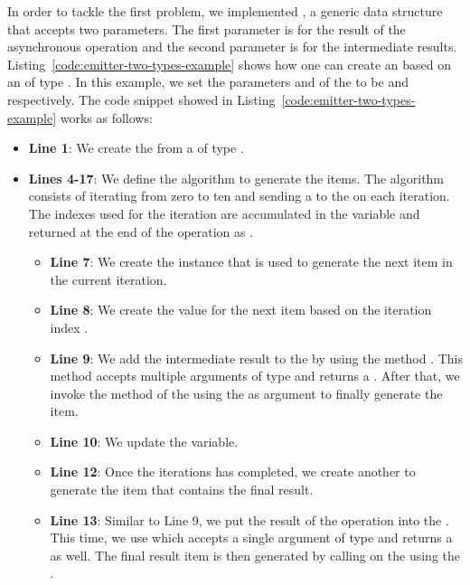 \documentclass[type=bsc,accentcolor=tud9c]{tudthesis}
\begin{document}
In order to tackle the first problem, we implemented , a generic data structure that accepts two parameters. The first parameter  is for the result of the asynchronous operation and the second parameter  is for the intermediate results. Listing~\ref{code:emitter-two-types-example} shows how one can create an  based on an  of type . In this example, we set the parameters  and  of the  to be  and  respectively. The code snippet showed in Listing~\ref{code:emitter-two-types-example} works as follows:
\begin{itemize}
	\item {\bf Line 1}: We create the  from a  of type .
	\item {\bf Lines 4-17}: We define the algorithm to generate the items. The algorithm consists of iterating from zero to ten and sending a  to the  on each iteration. The indexes  used for the iteration are accumulated in the variable  and returned at the end of the operation as .
	\begin{itemize}
		\item {\bf Line 7}: We create the  instance that is used to generate the next item in the current iteration.
		\item {\bf Line 8}: We create the  value for the next item based on the iteration index .
		\item {\bf Line 9}: We add the intermediate result  to the  by using the method . This method accepts multiple arguments of type  and returns a . After that, we invoke the  method of the  using the  as argument to finally generate the item.
		\item {\bf Line 10}: We update the  variable.
		\item {\bf Line 12}: Once the iterations has completed, we create another  to generate the item that contains the final result.
		\item {\bf Line 13}: Similar to Line 9, we put the result of the operation into the . This time, we use  which accepts a single argument of type  and returns a  as well. The final result item is then generated by calling  on the  using the .

\end{itemize}
\end{itemize}
\end{document}
